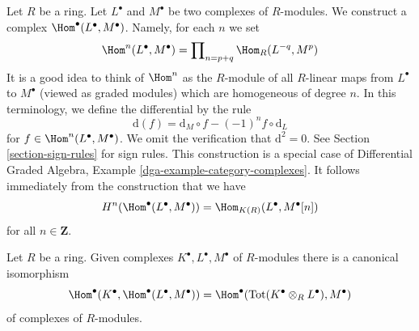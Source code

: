 \noindent
Let $R$ be a ring. Let $L^\bullet$ and $M^\bullet$ be two complexes
of $R$-modules. We construct a complex $\Hom^\bullet(L^\bullet, M^\bullet)$.
Namely, for each $n$ we set
$$
\Hom^n(L^\bullet, M^\bullet) =
\prod\nolimits_{n = p + q} \Hom_R(L^{-q}, M^p)
$$
It is a good idea to think of $\Hom^n$ as the $R$-module of all $R$-linear
maps from $L^\bullet$ to $M^\bullet$ (viewed as graded modules)
which are homogeneous of degree $n$. In this terminology, we define the
differential by the rule
$$
\text{d}(f) = \text{d}_M \circ f - (-1)^n f \circ \text{d}_L
$$
for $f \in \Hom^n(L^\bullet, M^\bullet)$.
We omit the verification that $\text{d}^2 = 0$.
See Section \ref{section-sign-rules} for sign rules.
This construction is a special case of
Differential Graded Algebra, Example \ref{dga-example-category-complexes}.
It follows immediately from the construction that we have
\begin{equation}
\label{equation-cohomology-hom-complex}
H^n(\Hom^\bullet(L^\bullet, M^\bullet)) = \Hom_{K(R)}(L^\bullet, M^\bullet[n])
\end{equation}
for all $n \in \mathbf{Z}$.

\begin{lemma}
\label{lemma-compose}
Let $R$ be a ring. Given complexes $K^\bullet, L^\bullet, M^\bullet$
of $R$-modules there is a canonical isomorphism
$$
\Hom^\bullet(K^\bullet, \Hom^\bullet(L^\bullet, M^\bullet))
=
\Hom^\bullet(\text{Tot}(K^\bullet \otimes_R L^\bullet), M^\bullet)
$$
of complexes of $R$-modules.
\end{lemma}

